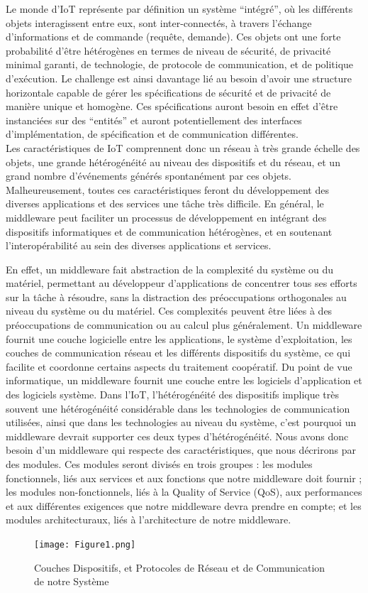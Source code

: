Le monde d’IoT représente par définition un système “intégré”, où les différents objets interagissent entre eux, sont inter-connectés, à travers l’échange d’informations et de commande (requête, demande). Ces objets ont une forte probabilité d’être hétérogènes en termes de niveau de sécurité, de privacité minimal garanti, de technologie, de protocole de communication, et de politique d’exécution. Le challenge est ainsi davantage lié au besoin d’avoir une structure horizontale capable de gérer les spécifications de sécurité et de privacité de manière unique et homogène. Ces spécifications auront besoin en effet d’être instanciées sur des “entités” et auront potentiellement des interfaces d’implémentation, de spécification et de communication différentes.
\\

Les caractéristiques de IoT comprennent donc un réseau à très grande échelle des objets, une grande hétérogénéité au niveau des dispositifs et du réseau, et un grand nombre d'événements générés spontanément par ces objets. Malheureusement, toutes ces caractéristiques feront du développement des diverses applications et des services une tâche très difficile. En général, le middleware peut faciliter un processus de développement en intégrant des dispositifs informatiques et de communication hétérogènes, et en soutenant l'interopérabilité au sein des diverses applications et services.

En effet, un middleware fait abstraction de la complexité du système ou du matériel, permettant au développeur d'applications de concentrer tous ses efforts sur la tâche à résoudre, sans la distraction des préoccupations orthogonales au niveau du système ou du matériel. Ces complexités peuvent être liées à des préoccupations de communication ou au calcul plus généralement. Un middleware fournit une couche logicielle entre les applications, le système d'exploitation, les couches de communication réseau et les différents dispositifs du système, ce qui facilite et coordonne certains aspects du traitement coopératif. Du point de vue informatique, un middleware fournit une couche entre les logiciels d'application et des logiciels système. Dans l'IoT, l’hétérogénéité des dispositifs implique très souvent une hétérogénéité considérable dans les technologies de communication utilisées, ainsi que dans les technologies au niveau du système, c’est pourquoi un middleware devrait supporter ces deux types d’hétérogénéité. Nous avons donc besoin d’un middleware qui respecte des caractéristiques, que nous décrirons par des modules. Ces modules seront divisés en trois groupes : les modules fonctionnels, liés aux services et aux fonctions que notre middleware doit fournir ; les modules non-fonctionnels, liés à la Quality of Service (QoS), aux performances et aux différentes exigences que notre middleware devra prendre en compte; et les modules architecturaux, liés à l’architecture de notre middleware.
\\
\begin{figure}[h!]
	\hspace*{-1cm}
	\centering
	\texttt{[image: Figure1.png]}
	\caption{Couches Dispositifs, et Protocoles de Réseau et de Communication de notre Système}
	\label{fig:balance}
\end{figure}

